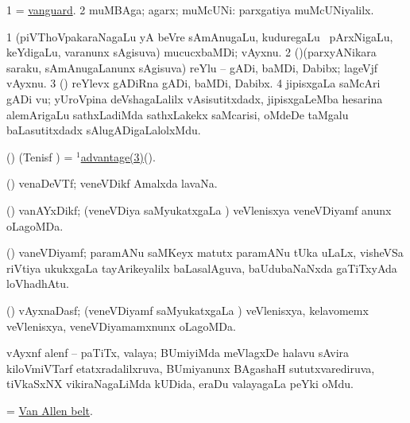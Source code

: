 \bentry
{} 
\gl{\nA}
\expl{}
\bmng
\bnum
\num{1} = \hyperlink{vanguard}{vanguard}. 
\num{2} muMBAga; agarx; muMcUNi:  parxgatiya muMcUNiyalilx. 
\enum
\emng
\eentry

\bentry
{} 
\gl{\nA}
\expl{}
\bmng
\bnum
\num{1} (piVThoVpakaraNagaLu yA beVre sAmAnugaLu, kuduregaLu \mo\ pArxNigaLu, keYdigaLu, \mo varanunx sAgisuva) mucucxbaMDi; vAyxnu. 
\num{2} (\birx)(parxyANikara saraku, sAmAnugaLanunx sAgisuva) reYlu -- gADi, baMDi, Dabibx; lageVjf vAyxnu. 
\num{3} (\birx) reYlevx gADiRna gADi, baMDi, Dabibx. 
\num{4} jipisxgaLa saMcAri gADi \mo vu; yUroVpina deVshagaLalilx vAsisutitxdadx, jipisxgaLeMba hesarina alemArigaLu sathxLadiMda sathxLakekx saMcarisi, oMdeDe taMgalu baLasutitxdadx sAlugADigaLalolxMdu. 
\enum
\emng
\eentry

\bentry
{} 
\gl{\nA}
\expl{}
\bmng
 (\birx) (Tenisf \AmA) = \hyperref{kandict_a.pdf}{A}{advantage(1)3}{$^1$advantage(3)}(\saMkiSx). 
\emng
\eentry

\bentry
{} 
\gl{\nA}
\expl{}
\bmng
 (\ravi) venaDeVTf; veneVDikf Amalxda lavaNa. 
\emng
\eentry

\bentry
{} 
\gl{\gu}
\expl{}
\bmng
 (\ravi) vanAYxDikf; (veneVDiya saMyukatxgaLa \vi)  veVlenisxya veneVDiyamf anunx oLagoMDa. 
\emng
\eentry

\bentry
{} 
\gl{\nA}
\expl{}
\bmng
 (\ravi) vaneVDiyamf; paramANu saMKeyx  matutx paramANu tUka uLaLx, visheVSa riVtiya ukukxgaLa tayArikeyalilx baLasalAguva, baUdubaNaNxda gaTiTxyAda loVhadhAtu. 
\emng
\eentry

\bentry
{} 
\gl{\gu}
\expl{}
\bmng
 (\ravi) vAyxnaDasf; (veneVDiyamf saMyukatxgaLa \vi)  veVlenisxya, kelavomemx  veVlenisxya, veneVDiyamamxnunx oLagoMDa. 
\emng
\eentry

\bentry
{}
\gl{\nA}
\expl{}
\bmng
 vAyxnf alenf -- paTiTx, valaya; BUmiyiMda meVlagxDe halavu sAvira kiloVmiVTarf etatxradalilxruva, BUmiyanunx BAgashaH sututxvarediruva, tiVkaSxNX vikiraNagaLiMda kUDida, eraDu valayagaLa peYki oMdu. 
\emng
\eentry

\bentry
{}
\gl{\nA}
\expl{}
\bmng
 = \hyperlink{Van Allen belt}{Van Allen belt}. 
\emng
\eentry

